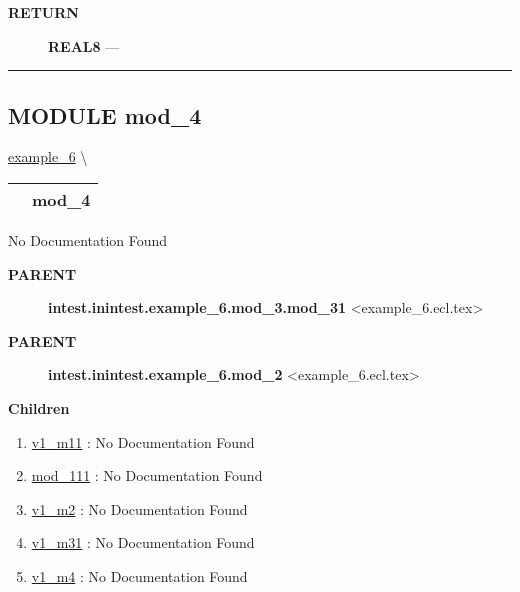\par
\begin{description}
\item [\colorbox{tagtype}{\color{white} \textbf{\textsf{RETURN}}}] \textbf{REAL8} --- 
\end{description}




\rule{\linewidth}{0.5pt}




\subsection*{\textsf{\colorbox{headtoc}{\color{white} MODULE}
mod\_4}}

\hypertarget{ecldoc:intest.inintest.example_6.mod_4}{}
\hspace{0pt} \hyperlink{ecldoc:intest.inintest.example_6}{example_6} \textbackslash 

{\renewcommand{\arraystretch}{1.5}
\begin{tabularx}{\textwidth}{|>{\raggedright\arraybackslash}l|X|}
\hline
\hspace{0pt}\mytexttt{\color{red} } & \textbf{mod\_4} \\
\hline
\end{tabularx}
}

\par





No Documentation Found










\par
\begin{description}
\item [\colorbox{tagtype}{\color{white} \textbf{\textsf{PARENT}}}] \textbf{intest.inintest.example\_6.mod\_3.mod\_31} <example\_6.ecl.tex>
\item [\colorbox{tagtype}{\color{white} \textbf{\textsf{PARENT}}}] \textbf{intest.inintest.example\_6.mod\_2} <example\_6.ecl.tex>
\end{description}


\textbf{Children}
\begin{enumerate}
\item \hyperlink{ecldoc:intest.inintest.example_6.mod_1.mod_11.v1_m11}{v1\_m11}
: No Documentation Found
\item \hyperlink{ecldoc:intest.inintest.example_6.mod_1.mod_11.mod_111}{mod\_111}
: No Documentation Found
\item \hyperlink{ecldoc:intest.inintest.example_6.mod_2.v1_m2}{v1\_m2}
: No Documentation Found
\item \hyperlink{ecldoc:intest.inintest.example_6.mod_3.mod_31.v1_m31}{v1\_m31}
: No Documentation Found
\item \hyperlink{ecldoc:intest.inintest.example_6.mod_4.v1_m4}{v1\_m4}
: No Documentation Found
\end{enumerate}


